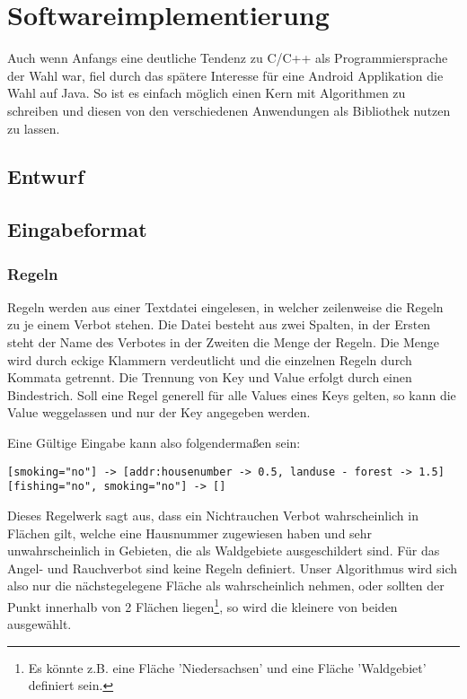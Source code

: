 \section{Softwareimplementierung}
Auch wenn Anfangs eine deutliche Tendenz zu C/C++ als Programmiersprache der Wahl war, fiel durch das spätere Interesse für eine
Android Applikation die Wahl auf Java. So ist es einfach möglich einen Kern mit Algorithmen zu schreiben und diesen von den
verschiedenen Anwendungen als Bibliothek nutzen zu lassen.

\subsection{Entwurf}


\subsection{Eingabeformat}
\subsubsection{Regeln}
\label{sec:Eingabedaten_Wir}
Regeln werden aus einer Textdatei eingelesen, in welcher zeilenweise die Regeln zu je einem Verbot stehen.
Die Datei besteht aus zwei Spalten, in der Ersten steht der Name des Verbotes in der Zweiten die Menge der Regeln.
Die Menge wird durch eckige Klammern verdeutlicht und die einzelnen Regeln durch Kommata getrennt.
Die Trennung von Key und Value erfolgt durch einen Bindestrich.
Soll eine Regel generell für alle Values eines Keys gelten, so kann die Value weggelassen und nur der Key angegeben werden.

Eine Gültige Eingabe kann also folgendermaßen sein:
\begin{lstlisting}[frame=single]
[smoking="no"] -> [addr:housenumber -> 0.5, landuse - forest -> 1.5]
[fishing="no", smoking="no"] -> []
\end{lstlisting}
Dieses Regelwerk sagt aus, dass ein Nichtrauchen Verbot wahrscheinlich in Flächen gilt, welche eine Hausnummer zugewiesen haben
und sehr unwahrscheinlich in Gebieten, die als Waldgebiete ausgeschildert sind.
Für das Angel- und Rauchverbot sind keine Regeln definiert. Unser Algorithmus wird sich also nur die nächstegelegene Fläche als wahrscheinlich nehmen,
oder sollten der Punkt innerhalb von 2 Flächen liegen\footnote{Es könnte z.B. eine Fläche 'Niedersachsen' und eine Fläche 'Waldgebiet' definiert sein.},
so wird die kleinere von beiden ausgewählt.

